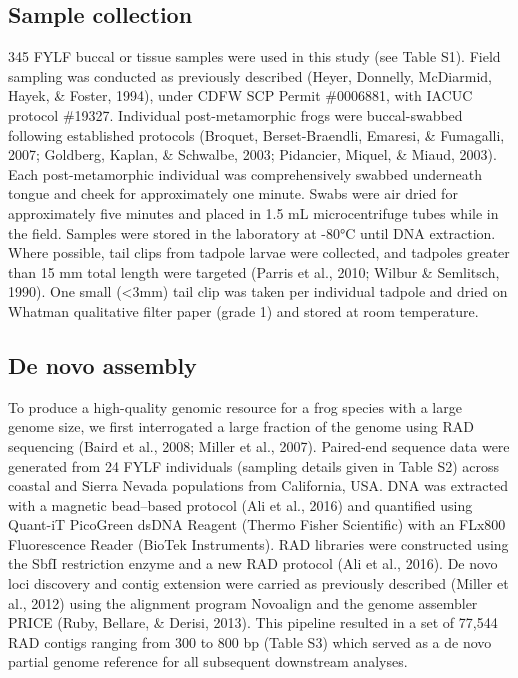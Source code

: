 \documentclass[twoside,12pt,final]{ucthesis-CA2012} %
\begin{document}
\begin{ucmainmatter}
{\subsection{Sample collection}\label{sample-collection}}

345 FYLF buccal or tissue samples were used in this study (see Table
S1). Field sampling was conducted as previously described (Heyer,
Donnelly, McDiarmid, Hayek, \& Foster, 1994), under CDFW SCP Permit
\#0006881, with IACUC protocol \#19327. Individual post-metamorphic
frogs were buccal-swabbed following established protocols (Broquet,
Berset-Braendli, Emaresi, \& Fumagalli, 2007; Goldberg, Kaplan, \&
Schwalbe, 2003; Pidancier, Miquel, \& Miaud, 2003). Each
post-metamorphic individual was comprehensively swabbed underneath
tongue and cheek for approximately one minute. Swabs were air dried for
approximately five minutes and placed in 1.5 mL microcentrifuge tubes
while in the field. Samples were stored in the laboratory at -80°C until
DNA extraction. Where possible, tail clips from tadpole larvae were
collected, and tadpoles greater than 15 mm total length were targeted
(Parris et al., 2010; Wilbur \& Semlitsch, 1990). One small
(\textless{}3mm) tail clip was taken per individual tadpole and dried on
Whatman qualitative filter paper (grade 1) and stored at room
temperature.

\hypertarget{de-novo-assembly}{%
\subsection{De novo assembly}\label{de-novo-assembly}}

To produce a high-quality genomic resource for a frog species with a
large genome size, we first interrogated a large fraction of the genome
using RAD sequencing (Baird et al., 2008; Miller et al., 2007).
Paired-end sequence data were generated from 24 FYLF individuals
(sampling details given in Table S2) across coastal and Sierra Nevada
populations from California, USA. DNA was extracted with a magnetic
bead--based protocol (Ali et al., 2016) and quantified using Quant-iT
PicoGreen dsDNA Reagent (Thermo Fisher Scientific) with an FLx800
Fluorescence Reader (BioTek Instruments). RAD libraries were constructed
using the SbfI restriction enzyme and a new RAD protocol (Ali et al.,
2016). De novo loci discovery and contig extension were carried as
previously described (Miller et al., 2012) using the alignment program
Novoalign and the genome assembler PRICE (Ruby, Bellare, \& Derisi,
2013). This pipeline resulted in a set of 77,544 RAD contigs ranging
from 300 to 800 bp (Table S3) which served as a de novo partial genome
reference for all subsequent downstream analyses.


\end{ucmainmatter}
\end{document}
